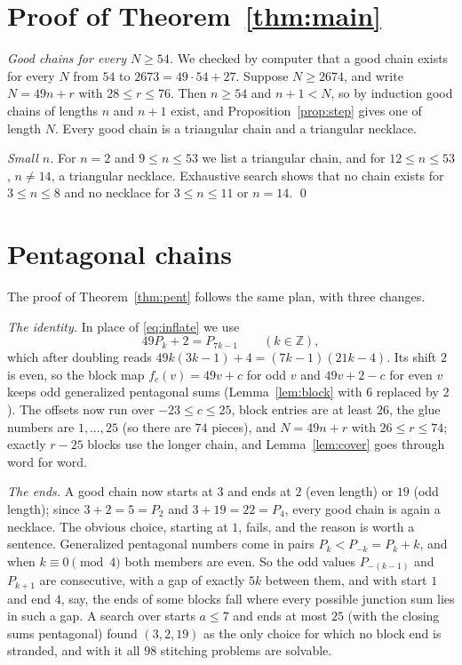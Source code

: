 \documentclass[11pt]{article}
\theoremstyle{definition}
\theoremstyle{remark}
\begin{document}
\section{Proof of Theorem~\ref{thm:main}}

\emph{Good chains for every $N\ge54$.} We checked by computer that a good chain exists for every
$N$ from $54$ to $2673=49\cdot54+27$. Suppose $N\ge2674$, and write $N=49n+r$ with
$28\le r\le76$. Then $n\ge54$ and $n+1<N$, so by induction good chains of lengths $n$ and $n+1$
exist, and Proposition~\ref{prop:step} gives one of length $N$. Every good chain is a triangular
chain and a triangular necklace.

\emph{Small $n$.} For $n=2$ and $9\le n\le53$ we list a triangular chain, and for
$12\le n\le 53$, $n\ne14$, a triangular necklace. Exhaustive search shows that no chain exists for
$3\le n\le 8$ and no necklace for $3\le n\le 11$ or $n=14$. \qed

\section{Pentagonal chains}

The proof of Theorem~\ref{thm:pent} follows the same plan, with three changes.

\emph{The identity.} In place of \eqref{eq:inflate} we use
\begin{equation}\label{eq:pent}
  49P_k+2=P_{7k-1}\qquad(k\in\mathbb Z),
\end{equation}
which after doubling reads $49k(3k-1)+4=(7k-1)(21k-4)$. Its shift $2$ is even, so the block map
$f_c(v)=49v+c$ for odd $v$ and $49v+2-c$ for even $v$ keeps odd generalized pentagonal sums
(Lemma~\ref{lem:block} with $6$ replaced by $2$). The offsets now run over $-23\le c\le25$, block entries are
at least $26$, the glue numbers are $1,\dots,25$ (so there are $74$ pieces), and $N=49n+r$ with $26\le r\le74$; exactly $r-25$ blocks
use the longer chain, and Lemma~\ref{lem:cover} goes through word for word.

\emph{The ends.} A good chain now starts at $3$ and ends at $2$ (even length) or $19$ (odd length); since
$3+2=5=P_2$ and $3+19=22=P_4$, every good chain is again a necklace. The obvious choice, starting at $1$,
fails, and the reason is worth a sentence. Generalized pentagonal numbers come in pairs $P_k<P_{-k}=P_k+k$,
and when $k\equiv0\pmod 4$ both members are even. So the odd values $P_{-(k-1)}$ and $P_{k+1}$ are consecutive, with a gap of exactly $5k$ between them, and
with start $1$ and end $4$, say, the ends of some blocks fall where every possible junction sum lies in such
a gap. A search over starts $a\le7$ and ends at most $25$ (with the closing sums
pentagonal) found $(3,2,19)$ as the only choice for which no block end is stranded, and with it all $98$
stitching problems are solvable.
\end{document}
